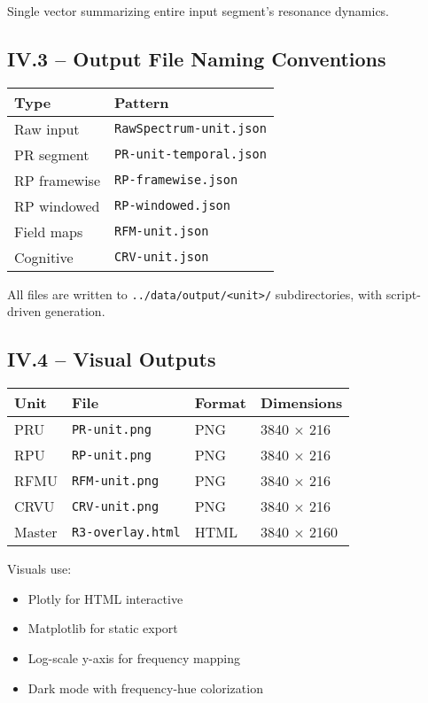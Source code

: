 \documentclass{article}
\begin{document}
Single vector summarizing entire input segment’s resonance dynamics.

\subsection*{IV.3 – Output File Naming Conventions}

\begin{center}
\begin{tabular}{|l|l|}
\hline
\textbf{Type} & \textbf{Pattern} \\
\hline
Raw input & \texttt{RawSpectrum-unit.json} \\
PR segment & \texttt{PR-unit-temporal.json} \\
RP framewise & \texttt{RP-framewise.json} \\
RP windowed & \texttt{RP-windowed.json} \\
Field maps & \texttt{RFM-unit.json} \\
Cognitive & \texttt{CRV-unit.json} \\
\hline
\end{tabular}
\end{center}

All files are written to \texttt{../data/output/<unit>/} subdirectories, with script-driven generation.

\subsection*{IV.4 – Visual Outputs}

\begin{center}
\begin{tabular}{|l|l|l|l|}
\hline
\textbf{Unit} & \textbf{File} & \textbf{Format} & \textbf{Dimensions} \\
\hline
PRU & \texttt{PR-unit.png} & PNG & 3840 × 216 \\
RPU & \texttt{RP-unit.png} & PNG & 3840 × 216 \\
RFMU & \texttt{RFM-unit.png} & PNG & 3840 × 216 \\
CRVU & \texttt{CRV-unit.png} & PNG & 3840 × 216 \\
Master & \texttt{R3-overlay.html} & HTML & 3840 × 2160 \\
\hline
\end{tabular}
\end{center}

Visuals use:

\begin{itemize}
    \item Plotly for HTML interactive
    \item Matplotlib for static export
    \item Log-scale y-axis for frequency mapping
    \item Dark mode with frequency-hue colorization
\end{itemize}
\end{document}
